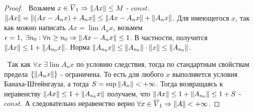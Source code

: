 \begin{proof}
\smallskip
\par\noindent\textbullet~Возьмем $x \in \overline{V}_1 \Rightarrow \left\lVert A x\right\rVert \le M$ - $const$. $\left\lVert A x\right\rVert = \left\lVert(A x - A_n x) + A_n x\right\rVert \le \left\lVert A x - A_n x\right\rVert + 
\left\lVert A_n x\right\rVert$. Для имеющегося $x$, так как можно написать $A x = \lim A_n x$, возьмем $\epsilon = 1, \; \exists n_0 : \forall n \ge n_0 \Rightarrow \left\lVert A x - A_n x\right\rVert \le 
1$. В частности, получится $\left\lVert A x\right\rVert \le 1 + \left\lVert A_{n_0} x\right\rVert$. Норма $\left\lVert A_{n_0}x\right\rVert \le \left\lVert A_{n_0}\right\rVert \cdot \left\lVert x\right\rVert \le \left\lVert A_{n_0}\right\rVert$.

\smallskip
\noindent\textbullet~Так как $\forall x \; \exists \lim A_n x$ по условию следствия, тогда по стандартным свойствам предела $\{ \left\lVert A_n x\right\rVert\}$ - ограничена. То есть для 
любого $x$ выполняется условия Банаха-Штейнгауза, а тогда $S = \sup \left\lVert A_n\right\rVert < +\infty$. Тогда возвращаясь к неравенству $\left\lVert A x\right\rVert \le 1 + \left\lVert A_{n_0} x\right\rVert$ получаем, 
что $\left\lVert A x\right\rVert \le 1 + \left\lVert A_{n_0}\right\rVert \le 1 + S$ - $const$. А следовательно неравенство верно $\forall x \in \overline{V}_1 \Rightarrow \left\lVert A\right\rVert < +\infty$.
\end{proof}